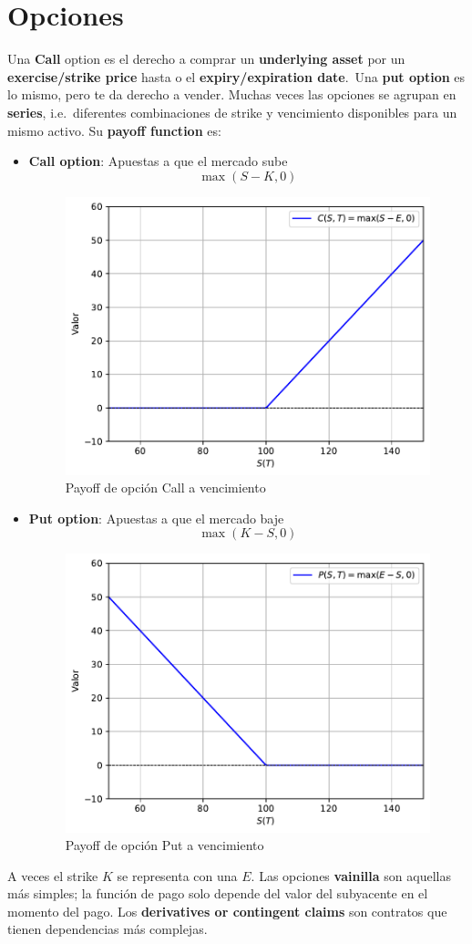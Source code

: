 

\section{Opciones}
Una \textbf{Call} option es el derecho a comprar un \textbf{underlying asset} por un \textbf{exercise/strike price} hasta o el \textbf{expiry/expiration date}.\ Una \textbf{put option} es lo mismo, pero te da derecho a vender. Muchas veces las opciones se agrupan en \textbf{series}, i.e.\ diferentes combinaciones de strike y vencimiento disponibles para un mismo activo. Su \textbf{payoff function} es:
\begin{itemize}
    \item \textbf{Call option}: Apuestas a que el mercado sube
    \[\boxed{\max(S-K, 0)}\]
    \begin{figure}[H]
        \centering
        \includegraphics[width=0.5\linewidth]{Imagenes/Parte1/2_Derivados/PayOffCall.pdf}
        \caption{Payoff de opción Call a vencimiento}
    \end{figure}
    \item \textbf{Put option}: Apuestas a que el mercado baje
    \[\boxed{\max(K-S, 0)}\]
    \begin{figure}[H]
        \centering
        \includegraphics[width=0.5\linewidth]{Imagenes/Parte1/2_Derivados/PayOffPut.pdf}
        \caption{Payoff de opción Put a vencimiento}
    \end{figure}
\end{itemize}
A veces el strike $K$ se representa con una $E$. Las opciones \textbf{vainilla} son aquellas más simples; la función de pago solo depende del valor del subyacente en el momento del pago. Los \textbf{derivatives or contingent claims} son contratos que tienen dependencias más complejas.


